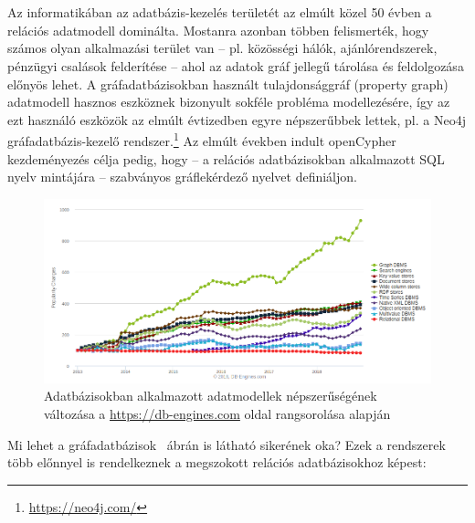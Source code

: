 \chapter{\bevezetes}

Az informatikában az adatbázis-kezelés területét az elmúlt közel 50 évben a relációs adatmodell dominálta. Mostanra azonban többen felismerték, hogy számos olyan alkalmazási terület van -- pl. közösségi hálók, ajánlórendszerek, pénzügyi csalások felderítése -- ahol az adatok gráf jellegű tárolása és feldolgozása előnyös lehet. A gráfadatbázisokban használt tulajdonsággráf (property graph) adatmodell hasznos eszköznek bizonyult sokféle probléma modellezésére, így az ezt használó eszközök az elmúlt évtizedben egyre népszerűbbek lettek, pl. a Neo4j gráfadatbázis-kezelő rendszer.\footnote{\url{https://neo4j.com/}} Az elmúlt években indult \mbox{openCypher} kezdeményezés célja pedig, hogy -- a relációs adatbázisokban alkalmazott SQL nyelv mintájára -- szabványos gráflekérdező nyelvet definiáljon.

\begin{figure}[!ht]
	\centering
	\includegraphics[width=150mm, keepaspectratio]{figures/graphdbms_trends.png}
	\caption{Adatbázisokban alkalmazott adatmodellek népszerűségének változása a \url{https://db-engines.com} oldal rangsorolása alapján}
	\label{fig:graphdbms_trends}
\end{figure}

Mi lehet a gráfadatbázisok ~ábrán is látható sikerének oka? Ezek a rendszerek több előnnyel is rendelkeznek a megszokott relációs adatbázisokhoz képest:

